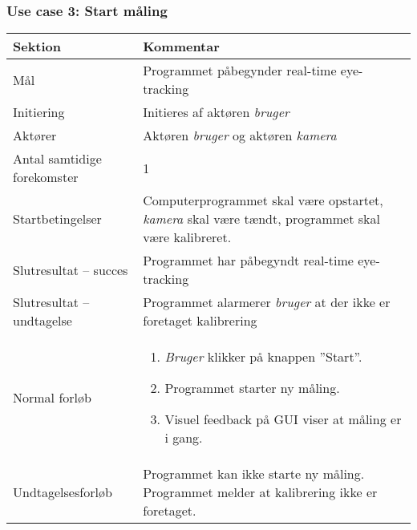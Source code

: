 \documentclass[kravspec.tex]{subfiles}
\begin{document}
	\subsubsection{Use case 3: Start måling}
	\begin{tabular}{|l|p{7.7cm}|}
		\hline \textbf{Sektion} 	& \textbf{Kommentar} \\ 
		\hline Mål  & Programmet påbegynder real-time eye-tracking \\ 
		\hline Initiering  & Initieres af aktøren \textit{bruger} \\ 
		\hline Aktører & Aktøren \textit{bruger} og aktøren \textit{kamera} \\ 
		\hline Antal samtidige forekomster & 1 \\ 
		\hline Startbetingelser & Computerprogrammet skal være opstartet, \textit{kamera} skal være tændt, programmet skal være kalibreret. \\ 
		\hline Slutresultat – succes & Programmet har påbegyndt real-time eye-tracking\\ 
		\hline Slutresultat – undtagelse & Programmet alarmerer \textit{bruger} at der ikke er foretaget kalibrering \\ 
		\hline Normal forløb & \begin{enumerate}
			\item \textit{Bruger} klikker på knappen ”Start”.
			\item Programmet starter ny måling.
			\item Visuel feedback på GUI viser at måling er i gang.
		\end{enumerate} \\  
		\hline Undtagelsesforløb & Programmet kan ikke starte ny måling. Programmet melder
			at kalibrering ikke er foretaget.\\
		\hline 
	\end{tabular}
\end{document}
